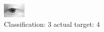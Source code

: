 \begin{figure}[h!]
\begin{center}
\includegraphics[width=0.60\columnwidth]{figures/ID2631_class_3_target_4.png}
\end{center}
\caption{ Classification: 3 actual target: 4}
\label{fig:ID2631_class_3_target_4}
\end{figure}
